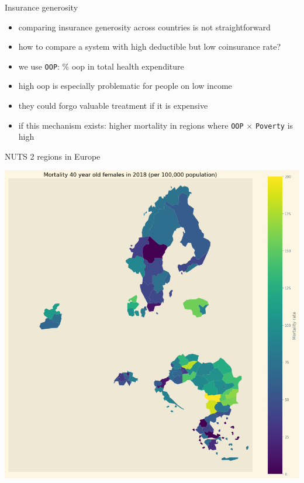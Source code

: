 \documentclass[presentation]{beamer}
\begin{document}
\begin{frame}[label={sec:orgc0e0b0f},fragile]{Insurance generosity}
 \begin{itemize}
\item comparing insurance generosity across countries is not straightforward
\item how to compare a system with high deductible but low coinsurance rate?
\item we use \texttt{OOP}: \% oop in total health expenditure
\item high oop is especially problematic for people on low income
\item they could forgo valuable treatment if it is expensive
\item if this mechanism exists: higher mortality in regions where \texttt{OOP} \(\times\) \texttt{Poverty} is high
\end{itemize}
\end{frame}

\begin{frame}[label={sec:org954a2fc}]{NUTS 2 regions in Europe}
\begin{center}
\includegraphics[width=.6\linewidth]{./figures/Europe_mortality_40_F_2018.png}
\label{fig:EUmap}
\end{center}
\end{frame}
\end{document}
